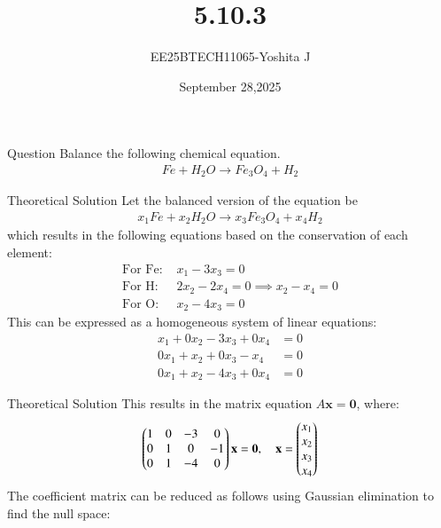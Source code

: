 \documentclass{beamer}
\begin{document}
\title 
{5.10.3}
\date{September 28,2025}


\author 
{EE25BTECH11065-Yoshita J}






\frame{\titlepage}
\begin{frame}{Question}
Balance the following chemical equation.
\begin{align*}
    Fe + H_2O \to Fe_3O_4 + H_2
\end{align*}
\bigskip

\end{frame}


\begin{frame}{Theoretical Solution}
Let the balanced version of the equation be
\begin{align}
    x_1 Fe + x_2 H_2O \to x_3 Fe_3O_4 + x_4 H_2
\end{align}
which results in the following equations based on the conservation of each element:
\begin{align}
    \text{For Fe: } &x_1 - 3x_3 = 0 \\
    \text{For H: } &2x_2 - 2x_4 = 0 \implies x_2 - x_4 = 0 \\
    \text{For O: } &x_2 - 4x_3 = 0
\end{align}
This can be expressed as a homogeneous system of linear equations:
\begin{align}
    x_1 + 0x_2 - 3x_3 + 0x_4 &= 0 \\
    0x_1 + x_2 + 0x_3 - x_4 &= 0 \\
    0x_1 + x_2 - 4x_3 + 0x_4 &= 0
\end{align}

\end{frame}

\begin{frame}{Theoretical Solution}
This results in the matrix equation $A\mathbf{x} = \mathbf{0}$, where:
\begin{align}
    \begin{pmatrix}
        1 & 0 & -3 & 0 \\
        0 & 1 & 0 & -1 \\
        0 & 1 & -4 & 0
    \end{pmatrix} \mathbf{x} = \mathbf{0},
    \quad \mathbf{x} = \begin{pmatrix} x_1 \\ x_2 \\ x_3 \\ x_4 \end{pmatrix}
\end{align}
The coefficient matrix can be reduced as follows using Gaussian elimination to find the null space:
\end{frame}
\end{document}

